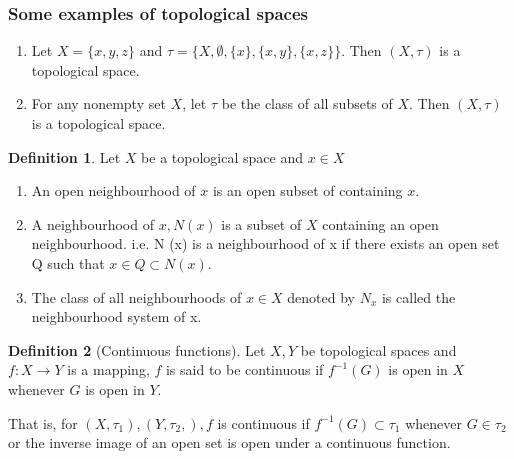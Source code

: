 \documentclass[a4paper, 12pt]{scrartcl}
\theoremstyle{definition}
\newtheorem{defn}{Definition}[thm]
\newcommand{\lra}{\longrightarrow}
\newcommand{\disp}{\displaystyle}
\begin{document}
    \subsubsection*{Some examples of topological spaces}
    \begin{enumerate}
        \item Let $X = \{x,y,z\}$ and $\tau = \{X, \emptyset, \{x\}, \{x,y\}, \{x,z\}\}$. Then $(X, \tau)$ is a topological space.
        \item For any nonempty set $X$, let $\tau$ be the class of all  subsets of $X$. Then $(X, \tau)$ is a topological space.
    \end{enumerate}

    \begin{defn}
        Let $X$ be a topological space and $x \in X$ 
        \begin{enumerate}
            \item An open neighbourhood of $x$ is an open subset of containing $x$.
            \item A neighbourhood of $x, N(x)$ is a subset of $X$ containing an open neighbourhood. i.e. N (x) is a neighbourhood of x if there exists an open set Q such that $x \in Q \subset N (x)$.
            \item The class of all neighbourhoods of $x \in X$ denoted by $N_x$ is called the neighbourhood system of x.
        \end{enumerate}
    \end{defn}

    \begin{defn}[Continuous functions]
        Let $X,Y$ be topological spaces and \\
        $\disp f: X \lra Y$ is a mapping, $f$ is said to be continuous if $\disp f^{-1}(G)$ is open in $X$ whenever $G$ is open in $Y$.

        That is, for $(X, \tau_1),(Y, \tau_2,), f$ is continuous if $f^{-1} (G) \subset \tau_1$ whenever $G \in \tau_2$ or the inverse image of an open set is open under a continuous function.
    \end{defn}
    
    
    
    
    
    
    
    
    
    
    
    
    
    
    
    
    
\end{document}
